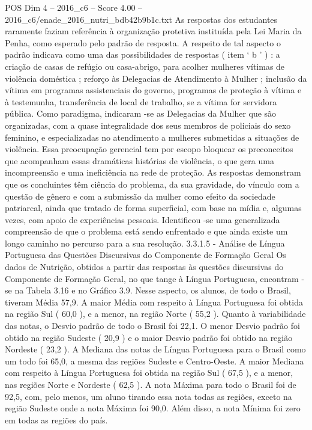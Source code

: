 \begin{textsample}{POS Dim 4 – 2016\_c6 – Score 4.00 – 2016\_c6/enade\_2016\_nutri\_bdb42b9b1c.txt}
As respostas dos estudantes raramente faziam referência à organização protetiva instituída pela Lei Maria da Penha, como esperado pelo padrão de resposta.
A respeito de tal aspecto o padrão indicava como uma das possibilidades de respostas ( item ‘ b ’ ) : a criação de casas de refúgio ou casa-abrigo, para acolher mulheres vítimas de violência doméstica ; reforço às Delegacias de Atendimento à Mulher ; inclusão da vítima em programas assistenciais do governo, programas de proteção à vítima e à testemunha, transferência de local de trabalho, se a vítima for servidora pública.
Como paradigma, indicaram -se as Delegacias da Mulher que são organizadas, com a quase integralidade dos seus membros de policiais do sexo feminino, e especializadas no atendimento a mulheres submetidas a situações de violência.
Essa preocupação gerencial tem por escopo bloquear os preconceitos que acompanham essas dramáticas histórias de violência, o que gera uma incompreensão e uma ineficiência na rede de proteção.
As respostas demonstram que os concluintes têm ciência do problema, da sua gravidade, do vínculo com a questão de gênero e com a submissão da mulher como efeito da sociedade patriarcal, ainda que tratado de forma superficial, com base na mídia e, algumas vezes, com apoio de experiências pessoais.
Identificou -se uma generalizada compreensão de que o problema está sendo enfrentado e que ainda existe um longo caminho no percurso para a sua resolução. 3.3.1.5 - Análise de Língua Portuguesa das Questões Discursivas do Componente de Formação Geral Os dados de Nutrição, obtidos a partir das respostas às questões discursivas do Componente de Formação Geral, no que tange à Língua Portuguesa, encontram -se na Tabela 3.16 e no Gráfico 3.9.
Nesse aspecto, os alunos, de todo o Brasil, tiveram Média 57,9.
A maior Média com respeito à Língua Portuguesa foi obtida na região Sul ( 60,0 ), e a menor, na região Norte ( 55,2 ).
Quanto à variabilidade das notas, o Desvio padrão de todo o Brasil foi 22,1.
O menor Desvio padrão foi obtido na região Sudeste ( 20,9 ) e o maior Desvio padrão foi obtido na região Nordeste ( 23,2 ).
A Mediana das notas de Língua Portuguesa para o Brasil como um todo foi 65,0, a mesma das regiões Sudeste e Centro-Oeste.
A maior Mediana com respeito à Língua Portuguesa foi obtida na região Sul ( 67,5 ), e a menor, nas regiões Norte e Nordeste ( 62,5 ).
A nota Máxima para todo o Brasil foi de 92,5, com, pelo menos, um aluno tirando essa nota todas as regiões, exceto na região Sudeste onde a nota Máxima foi 90,0.
Além disso, a nota Mínima foi zero em todas as regiões do país.

\end{textsample}
